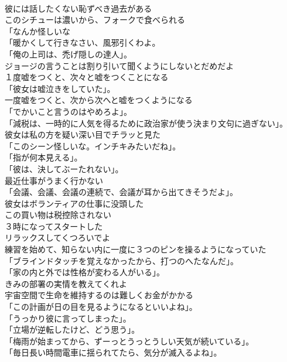\documentclass[8pt]{extreport}
\begin{document}
\begin{CJK}{UTF8}{min}
\\	彼には話したくない恥ずべき過去がある	
\\	このシチューは濃いから、フォークで食べられる	
\\	「なんか怪しいな	
\\	「暖かくして行きなさい、風邪引くわよ。	
\\	「俺の上司は、禿げ隠しの達人」。	
\\	ジョージの言うことは割り引いて聞くようにしないとだめだよ	
\\	１度嘘をつくと、次々と嘘をつくことになる	
\\	「彼女は嘘泣きをしていた」。	
\\	一度嘘をつくと、次から次へと嘘をつくようになる	
\\	「でかいこと言うのはやめろよ」。	
\\	「減税は、一時的に人気を得るために政治家が使う決まり文句に過ぎない」。	
\\	彼女は私の方を疑い深い目でチラッと見た	
\\	「このシーン怪しいな。インチキみたいだね」。	
\\	「指が何本見える」。	
\\	「彼は、決してぶーたれない」。	
\\	最近仕事がうまく行かない	
\\	「会議、会議、会議の連続で、会議が耳から出てきそうだよ」。	
\\	彼女はボランティアの仕事に没頭した	
\\	この買い物は税控除されない	
\\	３時になってスタートした	
\\	リラックスしてくつろいでよ	
\\	練習を始めて、知らない内に一度に３つのピンを操るようになっていた	
\\	「ブラインドタッチを覚えなかったから、打つのへたなんだ」。	
\\	「家の内と外では性格が変わる人がいる」。	
\\	きみの部署の実情を教えてくれよ	
\\	宇宙空間で生命を維持するのは難しくお金がかかる	
\\	「この計画が日の目を見るようになるといいよね」。	
\\	「うっかり彼に言ってしまった」。	
\\	「立場が逆転したけど、どう思う」。	
\\	「梅雨が始まってから、ずーっとうっとうしい天気が続いている」。	
\\	「毎日長い時間電車に揺られてたら、気分が滅入るよね」。	

\end{CJK}
\end{document}

